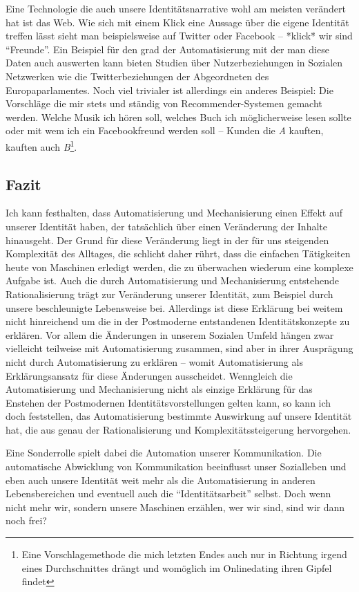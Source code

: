 Eine Technologie die auch unsere Identitätsnarrative wohl am meisten verändert hat ist das Web.
Wie sich mit einem Klick eine Aussage über die eigene Identität treffen lässt sieht man beispielsweise auf Twitter oder Facebook – *klick* wir sind \enquote{Freunde}.
Ein Beispiel für den grad der Automatisierung mit der man diese Daten auch auswerten kann bieten Studien über Nutzerbeziehungen in Sozialen Netzwerken wie die Twitterbeziehungen der Abgeordneten des Europaparlamentes\parencite{maireder}.
Noch viel trivialer ist allerdings ein anderes Beispiel: Die Vorschläge die mir stets und ständig von Recommender-Systemen gemacht werden.
Welche Musik ich hören soll, welches Buch ich möglicherweise lesen sollte oder mit wem ich ein Facebookfreund werden soll – Kunden die \emph{A} kauften, kauften auch \emph{B}\footnote{Eine Vorschlagemethode die mich letzten Endes auch nur in Richtung irgend eines Durchschnittes drängt und womöglich im Onlinedating ihren Gipfel findet}.


\subsection {Fazit}

Ich kann festhalten, dass Automatisierung und Mechanisierung einen Effekt auf unserer Identität haben, der tatsächlich über einen Veränderung der Inhalte hinausgeht.
Der Grund für diese Veränderung liegt in der für uns steigenden Komplexität des Alltages, die schlicht daher rührt, dass die einfachen Tätigkeiten heute von Maschinen erledigt werden, die zu überwachen wiederum eine komplexe Aufgabe ist.
Auch die durch Automatisierung und Mechanisierung entstehende Rationalisierung trägt zur Veränderung unserer Identität, zum Beispiel durch unsere beschleunigte Lebensweise bei.
Allerdings ist diese Erklärung bei weitem nicht hinreichend um die in der Postmoderne entstandenen Identitätskonzepte zu erklären.
Vor allem die Änderungen in unserem Sozialen Umfeld hängen zwar vielleicht teilweise mit Automatisierung zusammen, sind aber in ihrer Ausprägung nicht durch Automatisierung zu erklären – womit Automatisierung als Erklärungsansatz für diese Änderungen ausscheidet.
Wenngleich die Automatisierung und Mechanisierung nicht als einzige Erklärung für das Enstehen der Postmodernen Identitätsvorstellungen gelten kann, so kann ich doch feststellen, das Automatisierung bestimmte Auswirkung auf unsere Identität hat, die aus genau der Rationalisierung und Komplexitätssteigerung hervorgehen.

Eine Sonderrolle spielt dabei die Automation unserer Kommunikation.
Die automatische Abwicklung von Kommunikation beeinflusst unser Sozialleben und eben auch unsere Identität weit mehr als die Automatisierung in anderen Lebensbereichen und eventuell auch die \enquote{Identitätsarbeit} selbst.
Doch wenn nicht mehr wir, sondern unsere Maschinen erzählen, wer wir sind, sind wir dann noch frei?
